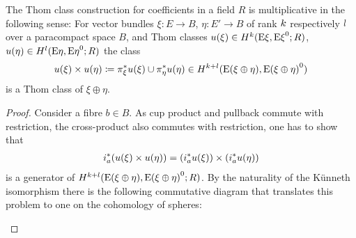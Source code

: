 \begin{Cor}\label{cor:thomclassmultiplicative}
  The Thom class construction for coefficients in a field $R$ is
  multiplicative in the following sense:
  For vector bundles $\xi\colon E\to B$, $\eta\colon E'\to B$
  of rank $k$ respectively $l$ over a paracompact space $B$, and Thom
  classes
  ${u}(\xi)\in H^{k}(\mathrm{E}\xi, {\mathrm{E}\xi}^0; R)$,
  ${u}(\eta)\in H^{l}(\mathrm{E}\eta, {\mathrm{E}\eta}^0; R)$
  the class
  \begin{gather*}
    {u}(\xi)\times{u}(\eta)
    \coloneqq {\pi}^*_\xi{u}(\xi) \cup {\pi}^*_\eta{u}(\eta)
    \in H^{k+l}(\mathrm{E}(\xi\oplus\eta), {\mathrm{E}(\xi\oplus\eta)}^0)
  \end{gather*}
  is a Thom class of $\xi\oplus\eta$.
  \begin{proof}
    Consider a fibre $b\in B$. As cup product and pullback commute
    with restriction, the cross-product also commutes with
    restriction, \idest one has to show that
    \begin{gather*}
      {i}^*_a({u}(\xi)\times{u}(\eta))
      = \left({i}^*_a{u}(\xi)\right)
      \times \left({i}^*_a{u}(\eta)\right)
    \end{gather*}
    is a generator of
    $H^{k+l}(\mathrm{E}(\xi\oplus\eta), {\mathrm{E}(\xi\oplus\eta)}^0;R)$.
    By the naturality of the Künneth isomorphism there is the
    following commutative diagram that translates this problem to one
    on the cohomology of spheres:
    \begin{center}
\end{center}
\end{proof}
\end{Cor}
